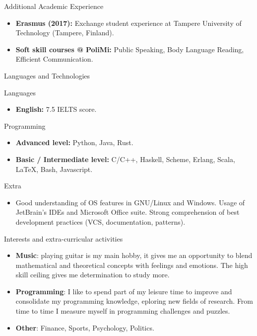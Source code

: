 \documentclass[]{cv}
\begin{document}
	\begin{cvsection}{Additional Academic Experience}
		\begin{cvsubsection}{}{}{}	
			\begin{itemize}
				\item \textbf{Erasmus (2017):} Exchange student experience at Tampere University of Technology (Tampere, Finland).
				\item \textbf{Soft skill courses @ PoliMi:} Public Speaking, Body Language Reading, Efficient Communication.
			\end{itemize}
		\end{cvsubsection}
	\end{cvsection}
	
	\begin{cvsection}{Languages and Technologies}
		\begin{cvsubsection}{Languages}{}{}	
			\begin{itemize}
				\item \textbf{English:} 7.5 IELTS score.
			\end{itemize}
		\end{cvsubsection}
		\begin{cvsubsection}{Programming}{}{}	
			\begin{itemize}
				\item \textbf{Advanced level:} Python, Java, Rust.
				\item \textbf{Basic / Intermediate level:} C/C++, Haskell, Scheme, Erlang, Scala, LaTeX, Bash, Javascript.
			\end{itemize}
		\end{cvsubsection}
		\begin{cvsubsection}{Extra}{}{}	
			\begin{itemize}
				\item Good understanding of OS features in GNU/Linux and Windows. Usage of JetBrain's IDEs and Microsoft Office suite. Strong comprehension of best development practices (VCS, documentation, patterns).
			\end{itemize}
		\end{cvsubsection}
	\end{cvsection}
	
	\begin{cvsection}{Interests and extra-curricular activities}
		\begin{cvsubsection}{}{}{}	
			\begin{itemize}
				\item \textbf{Music}: playing guitar is my main hobby, it gives me an opportunity to blend mathematical and theoretical concepts with feelings and emotions. The high skill ceiling gives me determination to study more. 
				\item \textbf{Programming}: I like to spend part of my leisure time to improve and consolidate my programming knowledge, eploring new fields of research. From time to time I measure myself in programming challenges and puzzles.
				\item \textbf{Other}: Finance, Sports, Psychology, Politics.
			\end{itemize}
		\end{cvsubsection}
	\end{cvsection}
	
\end{document}
